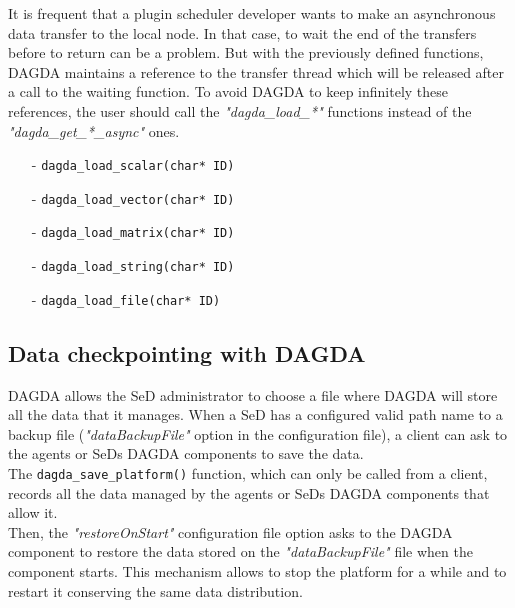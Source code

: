 It is frequent that a plugin scheduler developer wants to make an asynchronous
data transfer to the local \diet node. In that case, to wait the end of the
transfers before to return can be a problem. But with the previously defined
functions, DAGDA maintains a reference to the transfer thread which will be
released after a call to the waiting function. To avoid DAGDA to keep
infinitely these references, the user should call the \textit{"dagda\_load\_*"}
functions instead of the \textit{"dagda\_get\_*\_async"} ones.

\begin{itemize}
\item[-] \verb#dagda_load_scalar(char* ID)#
\item[-] \verb#dagda_load_vector(char* ID)#
\item[-] \verb#dagda_load_matrix(char* ID)#
\item[-] \verb#dagda_load_string(char* ID)#
\item[-] \verb#dagda_load_file(char* ID)#
\end{itemize}

\subsection{Data checkpointing with DAGDA}
DAGDA allows the SeD administrator to choose a file where DAGDA will store
all the data that it manages. When a SeD has a configured valid path name to a
backup file (\textit{"dataBackupFile"} option in the configuration file),
a client can ask to the agents or SeDs DAGDA components to save the data.\\

The \verb#dagda_save_platform()# function, which can only be
called from a client, records all the data managed by the agents or SeDs DAGDA
components that allow it.\\
Then, the \textit{"restoreOnStart"} configuration file option asks to the
DAGDA component to restore the data stored on the \textit{"dataBackupFile"}
file when the component starts. This mechanism allows to stop the \diet
platform for a while and to restart it conserving the same data distribution.

